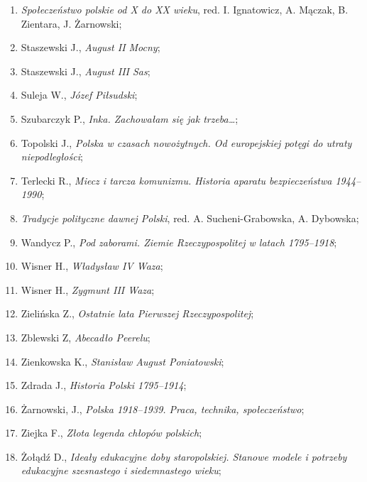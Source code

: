 \documentclass[a4paper,11pt]{article}
\begin{document}
\begin{enumerate}
\item \emph{Społeczeństwo polskie od X do XX wieku}, red. I.
  Ignatowicz, A. Mączak, B. Zientara, J. Żarnowski;

\item Staszewski J., \emph{August II Mocny};

\item Staszewski J., \emph{August III Sas};

\item Suleja W., \emph{Józef Piłsudski};

\item Szubarczyk P., \emph{Inka. Zachowałam się jak trzeba\ldots};

\item Topolski J., \emph{Polska w czasach nowożytnych. Od europejskiej
    potęgi do utraty niepodległości};

\item Terlecki R., \emph{Miecz i tarcza komunizmu. Historia aparatu
    bezpieczeństwa 1944--1990};

\item \emph{Tradycje polityczne dawnej Polski}, red. A.
  Sucheni-Grabowska, A. Dybowska;

\item Wandycz P., \emph{Pod zaborami. Ziemie Rzeczypospolitej w latach
    1795--1918};

\item Wisner H., \emph{Władysław IV Waza};

\item Wisner H., \emph{Zygmunt III Waza};

\item Zielińska Z., \emph{Ostatnie lata Pierwszej Rzeczypospolitej};

\item Zblewski Z, \emph{Abecadło Peerelu};

\item Zienkowska K., \emph{Stanisław August Poniatowski};

\item Zdrada J., \emph{Historia Polski 1795--1914};

\item Żarnowski, J., \emph{Polska 1918--1939. Praca, technika,
    społeczeństwo};

\item Ziejka F., \emph{Złota legenda chłopów polskich};

\item Żołądź D., \emph{Ideały edukacyjne doby staropolskiej. Stanowe
    modele i potrzeby edukacyjne szesnastego i siedemnastego wieku};


\end{enumerate}
\end{document}
